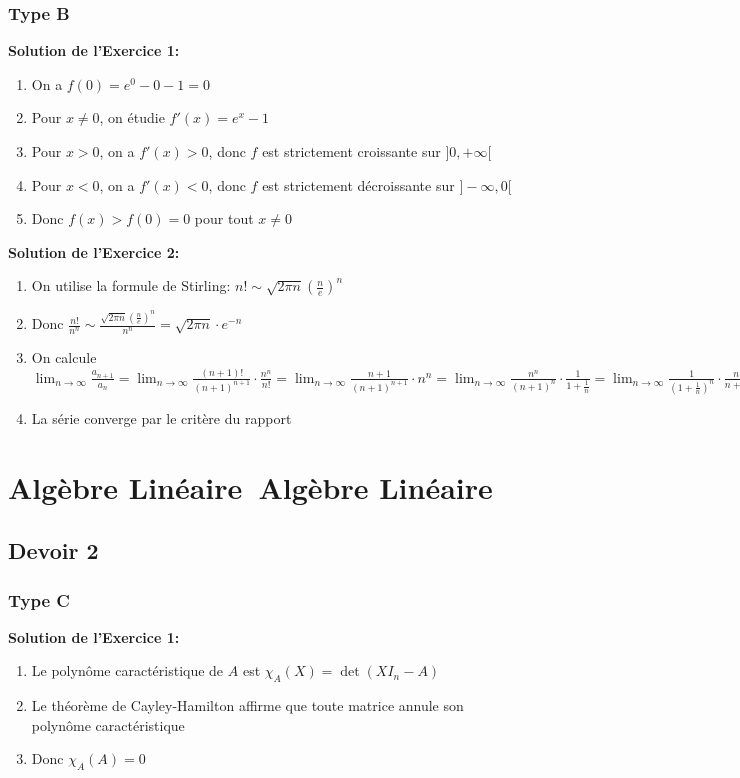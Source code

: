 \documentclass[11pt,%
	fleqn,%
	a4paper,%
	twoside%
]{backagBook}
\def\faVectorSquare{Algèbre Linéaire}%
\begin{document}
\subsubsection{Type B}
\begin{solution}
\textbf{Solution de l'Exercice 1:}
\begin{enumerate}
    \item On a $f(0) = e^0 - 0 - 1 = 0$
    \item Pour $x \neq 0$, on étudie $f'(x) = e^x - 1$
    \item Pour $x > 0$, on a $f'(x) > 0$, donc $f$ est strictement croissante sur $]0,+\infty[$
    \item Pour $x < 0$, on a $f'(x) < 0$, donc $f$ est strictement décroissante sur $]-\infty,0[$
    \item Donc $f(x) > f(0) = 0$ pour tout $x \neq 0$
\end{enumerate}
\end{solution}

\begin{solution}
\textbf{Solution de l'Exercice 2:}
\begin{enumerate}
    \item On utilise la formule de Stirling: $n! \sim \sqrt{2\pi n}\left(\frac{n}{e}\right)^n$
    \item Donc $\frac{n!}{n^n} \sim \frac{\sqrt{2\pi n}\left(\frac{n}{e}\right)^n}{n^n} = \sqrt{2\pi n} \cdot e^{-n}$
    \item On calcule $\lim_{n\to\infty} \frac{a_{n+1}}{a_n} = \lim_{n\to\infty} \frac{(n+1)!}{(n+1)^{n+1}} \cdot \frac{n^n}{n!} = \lim_{n\to\infty} \frac{n+1}{(n+1)^{n+1}} \cdot n^n = \lim_{n\to\infty} \frac{n^n}{(n+1)^n} \cdot \frac{1}{1+\frac{1}{n}} = \lim_{n\to\infty} \frac{1}{(1+\frac{1}{n})^n} \cdot \frac{n}{n+1} = \frac{1}{e} < 1$
    \item La série converge par le critère du rapport
\end{enumerate}
\end{solution}

\section{\protect\faVectorSquare\ Algèbre Linéaire}

\subsection{Devoir 2}
\subsubsection{Type C}
\begin{solution}
\textbf{Solution de l'Exercice 1:}
\begin{enumerate}
    \item Le polynôme caractéristique de $A$ est $\chi_A(X) = \det(X I_n - A)$
    \item Le théorème de Cayley-Hamilton affirme que toute matrice annule son polynôme caractéristique
    \item Donc $\chi_A(A) = 0$
\end{enumerate}
\end{solution}
\end{document}
